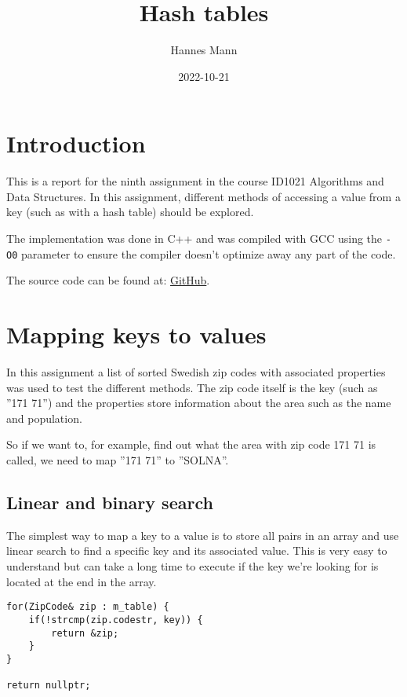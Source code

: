 \documentclass[a4paper,11pt]{article}
\begin{document}
\title{
    \textbf{Hash tables}
}
\author{Hannes Mann}
\date{2022-10-21}

\maketitle

\section*{Introduction}

This is a report for the ninth assignment in the course ID1021 Algorithms and Data Structures.
In this assignment, different methods of accessing a value from a key (such as with a hash table) should be explored.

The implementation was done in C++ and was compiled with GCC using the {\tt -O0} parameter to ensure the compiler doesn't optimize away any part of the code.

The source code can be found at: \href{https://github.com/hannesmann/ID1021/tree/d7466efeb483bf21add6e55fc028044168924d26/src/hashtable}{GitHub}.

\section*{Mapping keys to values}

In this assignment a list of sorted Swedish zip codes with associated properties was used to test the different methods.
The zip code itself is the key (such as ''171 71'') and the properties store information about the area such as the name and population.

So if we want to, for example, find out what the area with zip code 171 71 is called, we need to map ''171 71'' to ''SOLNA''.

\subsection*{Linear and binary search}

The simplest way to map a key to a value is to store all pairs in an array and use linear search to find a specific key and its associated value.
This is very easy to understand but can take a long time to execute if the key we're looking for is located at the end in the array.

\begin{verbatim}
for(ZipCode& zip : m_table) {
	if(!strcmp(zip.codestr, key)) {
		return &zip;
	}
}

return nullptr;
\end{verbatim}
\end{document}
